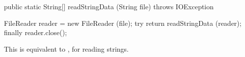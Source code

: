 \begin{code}

   public static String[] readStringData (String file) throws IOException\begin{hide} {
      FileReader reader = new FileReader (file);
      try {
         return readStringData (reader);
      }
      finally {
         reader.close();
      }
   }\end{hide}
\end{code}
\begin{tabb}   This is equivalent to ,
   for reading strings.
\end{tabb}
\begin{htmlonly}
\end{htmlonly}
